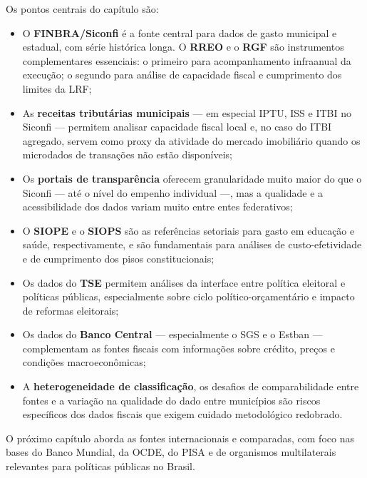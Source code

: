 Os pontos centrais do capítulo são:

\begin{itemize}
  \item O \textbf{FINBRA/Siconfi} é a fonte central para dados de gasto municipal e estadual, com série histórica longa. O \textbf{RREO} e o \textbf{RGF} são instrumentos complementares essenciais: o primeiro para acompanhamento infraanual da execução; o segundo para análise de capacidade fiscal e cumprimento dos limites da LRF;

  \item As \textbf{receitas tributárias municipais} --- em especial IPTU, ISS e ITBI no Siconfi --- permitem analisar capacidade fiscal local e, no caso do ITBI agregado, servem como proxy da atividade do mercado imobiliário quando os microdados de transações não estão disponíveis;

  \item Os \textbf{portais de transparência} oferecem granularidade muito maior do que o Siconfi --- até o nível do empenho individual ---, mas a qualidade e a acessibilidade dos dados variam muito entre entes federativos;

  \item O \textbf{SIOPE} e o \textbf{SIOPS} são as referências setoriais para gasto em educação e saúde, respectivamente, e são fundamentais para análises de custo-efetividade e de cumprimento dos pisos constitucionais;

  \item Os dados do \textbf{TSE} permitem análises da interface entre política eleitoral e políticas públicas, especialmente sobre ciclo político-orçamentário e impacto de reformas eleitorais;

  \item Os dados do \textbf{Banco Central} --- especialmente o SGS e o Estban --- complementam as fontes fiscais com informações sobre crédito, preços e condições macroeconômicas;

  \item A \textbf{heterogeneidade de classificação}, os desafios de comparabilidade entre fontes e a variação na qualidade do dado entre municípios são riscos específicos dos dados fiscais que exigem cuidado metodológico redobrado.
\end{itemize}

O próximo capítulo aborda as fontes internacionais e comparadas, com foco nas bases do Banco Mundial, da OCDE, do PISA e de organismos multilaterais relevantes para políticas públicas no Brasil.
